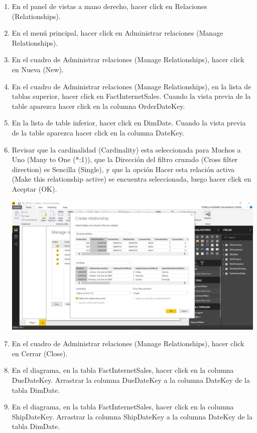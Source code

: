 \begin{enumerate}[1.]
    \item En el panel de vistas a mano derecho, hacer click en Relaciones (Relationships).
    \item En el menú principal, hacer click en Administrar relaciones (Manage Relationships).
    \item En el cuadro de Administrar relaciones (Manage Relationships), hacer click en Nueva (New).
    \item  En el cuadro de Administrar relaciones (Manage Relationships), en la lista de tablas superior, hacer click
en FactInternetSales. Cuando la vista previa de la table aparezca hacer click en la columna
OrderDateKey.
    \item En la lista de table inferior, hacer click en DimDate. Cuando la vista previa de la table aparezca hacer click
en la columna DateKey.
    \item Revisar que la cardinalidad (Cardinality) esta seleccionada para Muchos a Uno (Many to One (*:1)), que la
Dirección del filtro cruzado (Cross filter direction) es Sencilla (Single), y que la opción Hacer esta relación
activa (Make this relationship active) se encuentra seleccionada, luego hacer click en Aceptar (OK).

	\begin{center}
	\includegraphics[width=17cm]{./Imagenes/Ejercicio1-Tarea1/4}
	\end{center}	

    \item En el cuadro de Administrar relaciones (Manage Relationships), hacer click en Cerrar (Close).
   \item En el diagrama, en la tabla FactInternetSales, hacer click en la columna DueDateKey. Arrastrar la columna
DueDateKey a la columna DateKey de la tabla DimDate.
   \item En el diagrama, en la tabla FactInternetSales, hacer click en la columna ShipDateKey. Arrastrar la
columna ShipDateKey a la columna DateKey de la tabla DimDate.


\end{enumerate}
